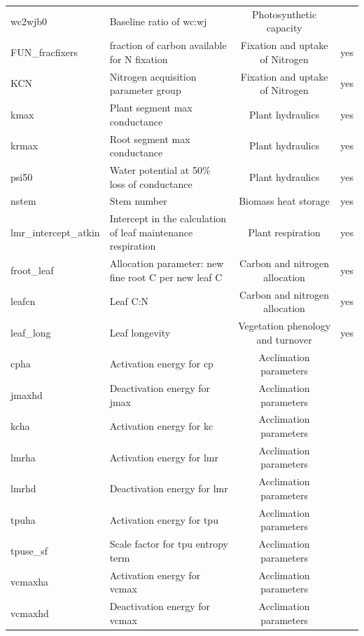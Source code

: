\documentclass[draft]{agujournal2019}
\begin{document}
\begin{landscape}
\begin{table}[h]
\begin{tabular}{l l c c}
wc2wjb0 & Baseline ratio of wc:wj & Photosynthetic capacity &\\
FUN\_fracfixers & fraction of carbon available for N fixation & Fixation and uptake of Nitrogen &yes\\
KCN & Nitrogen acquisition parameter group & Fixation and uptake of Nitrogen &yes\\
kmax & Plant segment max conductance & Plant hydraulics &yes\\
krmax & Root segment max conductance & Plant hydraulics &yes\\
psi50 & Water potential at 50\% loss of conductance & Plant hydraulics &yes\\
nstem & Stem number & Biomass heat storage &yes\\
lmr\_intercept\_atkin & Intercept in the calculation of leaf maintenance respiration& Plant respiration &yes\\
froot\_leaf & Allocation parameter: new fine root C per new leaf C & Carbon and nitrogen allocation &yes\\
leafcn & Leaf C:N & Carbon and nitrogen allocation &yes\\
leaf\_long & Leaf longevity & Vegetation phenology and turnover &yes\\
cpha & Activation energy for cp & Acclimation parameters &\\
jmaxhd & Deactivation energy for jmax & Acclimation parameters &\\
kcha & Activation energy for kc & Acclimation parameters &\\
lmrha & Activation energy for lmr & Acclimation parameters &\\
lmrhd & Deactivation energy for lmr & Acclimation parameters &\\
tpuha & Activation energy for tpu & Acclimation parameters &\\
tpuse\_sf & Scale factor for tpu entropy term & Acclimation parameters &\\
vcmaxha & Activation energy for vcmax & Acclimation parameters &\\
vcmaxhd & Deactivation energy for vcmax & Acclimation parameters &\\
 \hline
 \end{tabular}
 \end{table}
\end{landscape}
\end{document}
